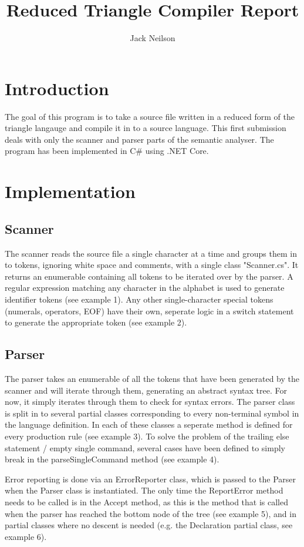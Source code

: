 \documentclass{article}
\begin{document}
\title{Reduced Triangle Compiler Report}
\author{Jack Neilson}
\maketitle
\newpage
\section{Introduction}
The goal of this program is to take a source file written in a reduced form of the triangle langauge and compile it in to a source language. This first submission deals with only the scanner and parser parts of the semantic analyser. The program has been implemented in C\# using .NET Core.

\section{Implementation}
\subsection{Scanner}
The scanner reads the source file a single character at a time and groups them in to tokens, ignoring white space and comments, with a single class "Scanner.cs". It returns an enumerable containing all tokens to be iterated over by the parser. A regular expression matching any character in the alphabet is used to generate identifier tokens (see example 1). Any other single-character special tokens (numerals, operators, EOF) have their own, seperate logic in a switch statement to generate the appropriate token (see example 2).

\subsection{Parser}
The parser takes an enumerable of all the tokens that have been generated by the scanner and will iterate through them, generating an abstract syntax tree. For now, it simply iterates through them to check for syntax errors. The parser class is split in to several partial classes corresponding to every non-terminal symbol in the language definition. In each of these classes a seperate method is defined for every production rule (see example 3). To solve the problem of the trailing else statement / empty single command, several cases have been defined to simply break in the parseSingleCommand method (see example 4).

Error reporting is done via an ErrorReporter class, which is passed to the Parser when the Parser class is instantiated. The only time the ReportError method needs to be called is in the Accept method, as this is the method that is called when the parser has reached the bottom node of the tree (see example 5), and in partial classes where no descent is needed (e.g. the Declaration partial class, see example 6).
\end{document}
